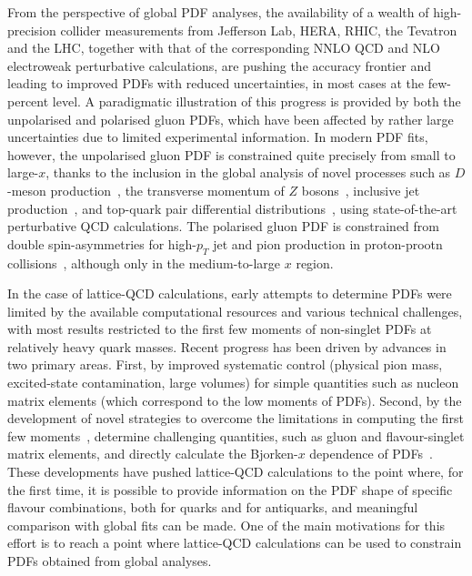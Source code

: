 From the perspective of global PDF analyses, the availability of a wealth of 
high-precision collider measurements from Jefferson Lab, HERA, RHIC, 
the Tevatron and the LHC, together with that of the corresponding
NNLO QCD and NLO electroweak perturbative calculations, are pushing the
accuracy frontier and leading to improved PDFs with reduced uncertainties,
in most cases at the few-percent level.
%
A paradigmatic illustration of this progress is provided by both the 
unpolarised and polarised gluon PDFs, which have been affected by rather 
large uncertainties due to limited experimental information.
%
In modern PDF fits, however, the unpolarised gluon PDF is constrained quite 
precisely from small to large-$x$, thanks to the inclusion in the
global analysis of novel processes such as $D$-meson
production~\cite{Zenaiev:2015rfa,Gauld:2016kpd},
the transverse momentum of $Z$ bosons~\cite{Boughezal:2017nla},
inclusive jet production~\cite{Currie:2016bfm}, and top-quark pair differential 
distributions~\cite{Czakon:2016olj,Guzzi:2014wia}, using state-of-the-art
perturbative QCD calculations.
%
The polarised gluon PDF is constrained from double spin-asymmetries for 
high-$p_T$ jet and pion production in proton-prootn 
collisions~\cite{deFlorian:2014yva,Nocera:2014gqa}, 
although only in the medium-to-large $x$ region.

In the case of lattice-QCD calculations, early attempts to determine PDFs were 
limited by the available computational resources and various technical 
challenges, with most results restricted to
the first few moments of non-singlet PDFs at relatively heavy quark masses.
%
Recent progress has been driven by advances in two primary areas. 
%
First, by improved systematic control (physical pion mass, excited-state 
contamination, large volumes) for simple quantities such as nucleon matrix 
elements (which correspond to the low moments of PDFs).
%
Second, by the  development of novel strategies to overcome the limitations in 
computing the first few 
moments~\cite{Constantinou:2014tga,Syritsyn:2014saa,Lin:2012ev}, 
determine challenging quantities, 
such as gluon and flavour-singlet matrix elements, and directly calculate the 
Bjorken-$x$ dependence of PDFs~\cite{Lin:2014zya,Alexandrou:2015rja,
Chen:2016utp,Alexandrou:2016jqi}.
%
These developments have pushed lattice-QCD calculations to the point where, 
for the first time, it is possible to provide information on the PDF shape
of specific flavour combinations, both for quarks and for antiquarks, 
and meaningful comparison with global fits can be made.
%
One of the main motivations for this effort is to reach a point where 
lattice-QCD calculations can be used to constrain 
PDFs obtained from global analyses.

